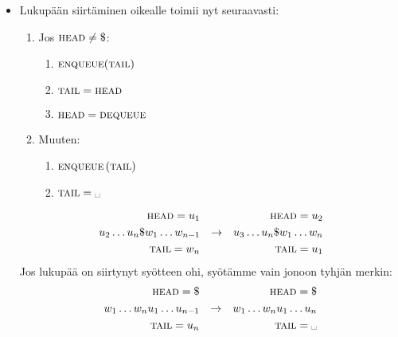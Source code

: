 \documentclass[finnish,11pt]{article}
\newcommand{\spc}{\text{\textvisiblespace}}
\begin{document}
\begin{enumerate}
\begin{itemize}
\item
  Lukupään siirtäminen oikealle toimii nyt seuraavasti:
  \begin{enumerate}[label=\arabic*.]
  \item
    Jos $\textsc{head} \neq \$$:
    \begin{enumerate}[label=\arabic*.]
    \item
      $\textsc{enqueue}(\textsc{tail})$
    \item
      $\textsc{tail} = \textsc{head}$
    \item
      $\textsc{head} = \textsc{dequeue}$
    \end{enumerate}
  \item
    Muuten:
    \begin{enumerate}[label=\arabic*.]
    \item
      $\textsc{enqueue}\left(\textsc{tail}\right)$
    \item
      $\textsc{tail} = \spc$
    \end{enumerate}
  \end{enumerate}
%
  \begin{align*}
    \textsc{head} = u_1 &&&& \textsc{head} = u_2 \\
    u_2 \dots u_n \$ w_1 \dots w_{n-1} && \to && u_3 \dots u_n \$ w_1 \dots w_n \\
    \textsc{tail} = w_n &&&& \textsc{tail} = u_1
  \end{align*}
%
  Jos lukupää on siirtynyt syötteen ohi, syötämme vain jonoon tyhjän merkin:
%
  \begin{align*}
    \textsc{head} = \$ &&&& \textsc{head} = \$ \\
    w_1 \dots w_nu_1 \dots u_{n-1} && \to && w_1 \dots w_nu_1 \dots u_n \\
    \textsc{tail} = u_n &&&& \textsc{tail} = \spc
  \end{align*}


\end{itemize}
\end{enumerate}
\end{document}
